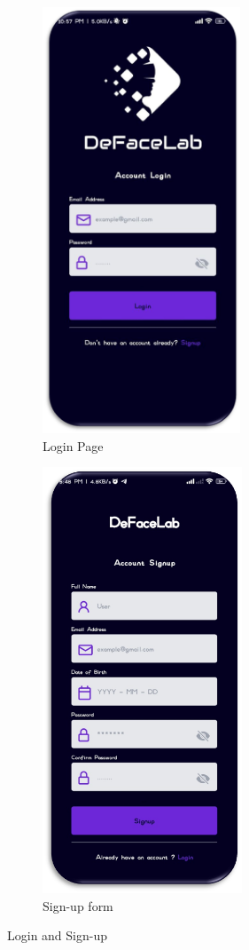 \begin{figure}[ht]
    \centering
    \begin{subfigure}[b]{0.45\textwidth}
        \centering
        \includegraphics[height=5in]{img/image.png}
        \caption{{Login Page}}
    \end{subfigure}
    \hfill
    \begin{subfigure}[b]{0.45\textwidth}
        \centering
        \includegraphics[height=5in]{img/signup.png}
        \caption{{Sign-up form}}
    \end{subfigure}
    \caption{Login and Sign-up}
\end{figure}

